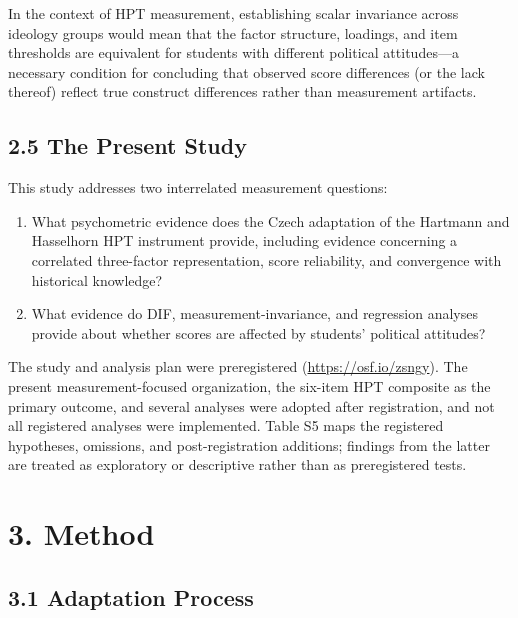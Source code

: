 \documentclass[PCJ,Unicode,screen,mode=plain]{cedram}
\begin{document}
In the context of HPT measurement, establishing scalar invariance across ideology groups would mean that the factor structure, loadings, and item thresholds are equivalent for students with different political attitudes---a necessary condition for concluding that observed score differences (or the lack thereof) reflect true construct differences rather than measurement artifacts.

\subsection*{2.5 The Present Study}\label{the-present-study}

This study addresses two interrelated measurement questions:

\begin{enumerate}
\def\labelenumi{\arabic{enumi}.}
\item[RQ1.]
  What psychometric evidence does the Czech adaptation of the Hartmann and Hasselhorn HPT instrument provide, including evidence concerning a correlated three-factor representation, score reliability, and convergence with historical knowledge?
\item[RQ2.]
  What evidence do DIF, measurement-invariance, and regression analyses provide about whether scores are affected by students' political attitudes?
\end{enumerate}

The study and analysis plan were preregistered
(\url{https://osf.io/zsngy}). The present
measurement-focused organization, the six-item HPT composite as the primary outcome, and several analyses were adopted
after registration, and not all registered analyses were implemented.
Table S5 maps the registered hypotheses, omissions, and
post-registration additions; findings from the latter are treated as
exploratory or descriptive rather than as preregistered tests.

\section*{3. Method}\label{method}

\subsection*{3.1 Adaptation Process}\label{adaptation-process}
\end{document}
